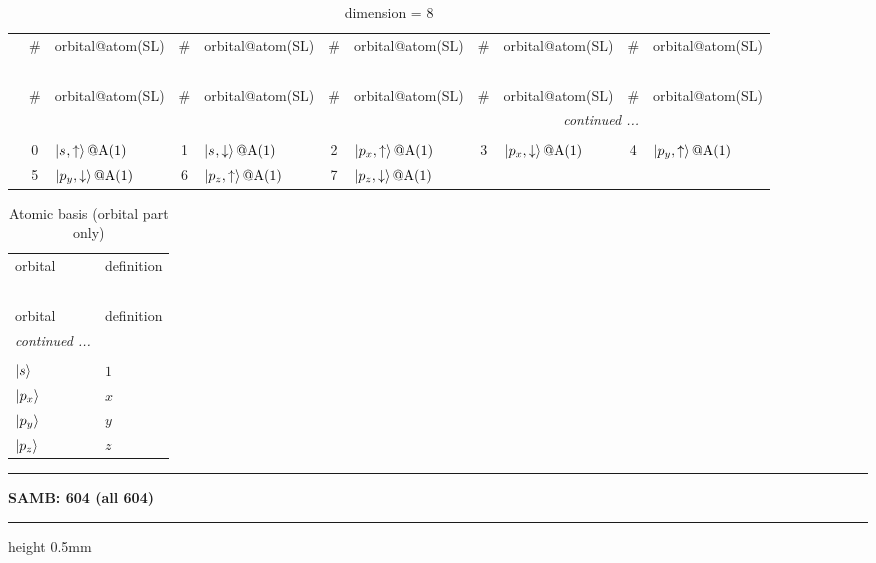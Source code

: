 \documentclass[fleqn,10pt,landscape]{jsarticle}
\begin{document}
\renewcommand{\arraystretch}{1.6}
\begin{longtable}[l]{c|cl|cl|cl|cl|cl}
\captionsetup{justification=raggedright, singlelinecheck=off}
\caption{dimension = 8}
 \\
 \hline \hline
 & \# & orbital@atom(SL) & \# & orbital@atom(SL) & \# & orbital@atom(SL) & \# & orbital@atom(SL) & \# & orbital@atom(SL) \\ \hline \endfirsthead

\multicolumn{10}{l}{\tablename\ \thetable{}} \\
 \hline \hline
 & \# & orbital@atom(SL) & \# & orbital@atom(SL) & \# & orbital@atom(SL) & \# & orbital@atom(SL) & \# & orbital@atom(SL) \\ \hline \endhead

 \hline \hline
\multicolumn{10}{r}{\footnotesize\it continued ...} \\ \endfoot

 \hline \hline
\multicolumn{10}{r}{} \\ \endlastfoot

 & 0 & $\ket{s_{},\uparrow}@{\rm A}(1)$ & 1 & $\ket{s_{},\downarrow}@{\rm A}(1)$ & 2 & $\ket{p_{x},\uparrow}@{\rm A}(1)$ & 3 & $\ket{p_{x},\downarrow}@{\rm A}(1)$ & 4 & $\ket{p_{y},\uparrow}@{\rm A}(1)$ \\
& 5 & $\ket{p_{y},\downarrow}@{\rm A}(1)$ & 6 & $\ket{p_{z},\uparrow}@{\rm A}(1)$ & 7 & $\ket{p_{z},\downarrow}@{\rm A}(1)$ &  &  &  &  \\
\end{longtable}
\renewcommand{\arraystretch}{1.6}
\begin{longtable}[l]{ll}
\captionsetup{justification=raggedright, singlelinecheck=off}
\caption{Atomic basis (orbital part only)}
 \\
 \hline \hline
orbital & definition \\ \hline \endfirsthead

\multicolumn{1}{l}{\tablename\ \thetable{}} \\
 \hline \hline
orbital & definition \\ \hline \endhead

 \hline \hline
\multicolumn{1}{r}{\footnotesize\it continued ...} \\ \endfoot

 \hline \hline
\multicolumn{1}{r}{} \\ \endlastfoot

$ \ket{s} $ & $ 1 $ \\ \hline
$ \ket{p_{x}} $ & $ x $ \\
$ \ket{p_{y}} $ & $ y $ \\
$ \ket{p_{z}} $ & $ z $ \\
\end{longtable}
\vspace{5mm}
\noindent \rule[0.5mm]{5mm}{0.5mm}\hspace{3mm}\textbf{SAMB: 604 (all 604)}\hspace{3mm}\leaders\hrule height 0.5mm\hfill\kern0pt
\vspace{3mm}
\end{document}
